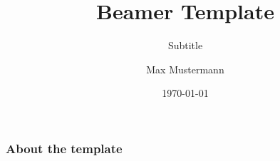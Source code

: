 \documentclass[
10pt, %
compress,
xcolor=table,
dvipsnames,
aspectratio=43,
]{beamer}
\title[]{Beamer Template}
\subtitle[short]{Subtitle}
\author[Max]{Max Mustermann}
\institute[Inst.]{Institute/Affiliation}
\date[]{\today}
\begin{document}
\maketitle





\begin{frame}
  \frametitle{About the template}
  

  
\end{frame}

\begin{frame}
\frametitle{}

\insertBib

\end{frame}
\end{document}
